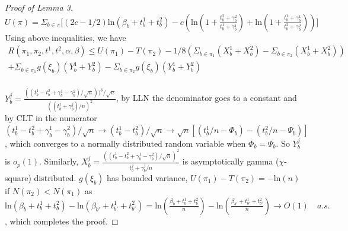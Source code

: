 \documentclass[aoas,preprint]{imsart}
\begin{document}
\begin{proof}[Proof of Lemma 3]
$U(\pi) = \Sigma_{b\in\pi}\big[(2c - 1/2) \text{ln}(\beta_b + t_b^1 + t_b^2) 
  - c(\text{ln}(1 + \frac{t_b^2 + \gamma_b^2}{t_b^1 + \gamma_b^1}) + \text{ln}(1 + \frac{t_b^1 + \gamma_b^1}{t_b^2 + \gamma_b^2}))\big]$\\
  
 Using above inequalities, we have 
 \begin{eqnarray*}
  R(\pi_1, \pi_2, t^1, t^2, \alpha, \beta)  \leq U(\pi_1) - T(\pi_2) - 1/8 (\Sigma_{b\in\pi_1}(X_b^1 + X_b^2) - \Sigma_{b\in\pi_2}(X_b^1 + X_b^2)) \\ 
 + \Sigma_{b\in\pi_1}g(\xi_b)(Y_b^1 + Y_b^2)  - \Sigma_{b\in\pi_2}g(\xi_ b)(Y_b^1 + Y_b^2)\\
 \end{eqnarray*}
 
 $Y_b^j =  \frac{((t_b^1 - t_b^2 + \gamma_b^1 - \gamma_b^2) / \sqrt{n}))^3 / \sqrt{n}}{((t_b^j + \gamma_b^j) /n)^2}$, by LLN the denominator goes to a constant and by CLT in the numerator $(t_b^1 - t_b^2 + \gamma_b^1 - \gamma_b^2) / \sqrt{n} \rightarrow (t_b^1 - t_b^2) / \sqrt{n} \rightarrow \sqrt{n}[(t_b^1 / n  - \Phi_b) - (t_b^2 / n - \Psi_b)]$, 
which converges to a normally distributed random variable when $\Phi_b = \Psi_b$. So $Y_b^j$ is $o_p(1)$. Similarly,  $X_b^j =  \frac{((t_b^1 - t_b^2 + \gamma_b^1 - \gamma_b^2) / \sqrt{n})^2}{t_b^j + \gamma_b^j / n}$ is asymptotically gamma ($\chi$-square) distributed.
$g(\xi_b)$ has bounded variance,
 $U(\pi_1) - T(\pi_2) = -\text{ln}(n)$ if $N(\pi_2) < N(\pi_1)$
 as $ \text{ln}(\beta_b + t_b^1 + t_b^2)  -  \text{ln}(\beta_{b'} + t_{b'}^1 + t_{b'}^2) =  \text{ln}(\frac{\beta_b + t_b^1 + t_b^2}{n})  -  \text{ln}(\frac{\beta_{b'} + t_{b'}^1 + t_{b'}^2}{n}) \rightarrow O(1) \quad a.s.$, which completes the proof.




\end{proof}

\end{document}
